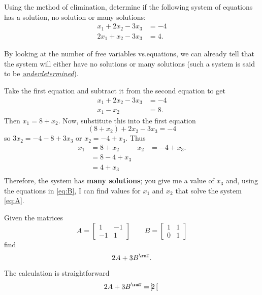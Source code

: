 \begin{questions}
  \question[10] Using the method of elimination, determine if the following
  system of equations has a solution, no solution or many solutions:
  \[
    \label{eq:A}
    \tag{$\bigstar$}
    \begin{aligned}
      x_1+2x_2-3x_3&=-4\\
      2x_1+x_2-3x_3&=4.
    \end{aligned}
  \]
  \begin{solution}
    By looking at the number of free variables vs.\@ equations, we can
    already tell that the system will either have no solutions or many
    solutions (such a system is said to be
    \emph{\href{https://en.wikipedia.org/wiki/Underdetermined_system}{underdetermined}}).

    Take the first equation and subtract it from the second equation to get
    \begin{align*}
      x_1+2x_2-3x_3&=-4\\
      x_1-x_2&=8.
    \end{align*}
    Then $x_1=8+x_2$. Now, substitute this into the first equation
    \[
      (8+x_2)+2x_2-3x_3=-4
    \]
    so $3x_2=-4-8+3x_3$ or $x_2=-4+x_3$. Thus
    \[
      \label{eq:B}
      \tag{$\spadesuit$}
      \begin{aligned}
        x_1&=8+x_2&
        x_2&=-4+x_3.\\
        &=8-4+x_3\\
        &=4+x_3\\
      \end{aligned}
    \]
    Therefore, the system has \textbf{many solutions}; you give me a value
    of $x_3$ and, using the equations in \eqref{eq:B}, I can find values
    for $x_1$ and $x_2$ that solve the system \eqref{eq:A}.
  \end{solution}
  \question[5] Given the matrices
  \[
    A=
    \begin{bmatrix}
      1&-1\\
      -1&1
    \end{bmatrix}
    \qquad
    B=
    \begin{bmatrix}
      1&1\\
      0&1
    \end{bmatrix}
  \]
  find
  \[
    2A+3B^\rmT.
  \]
  \begin{solution}
    The calculation is straightforward
    \begin{align*}
      2A+3B^\rmT
      &=
        2\begin{bmatrix}

\end{bmatrix}
\end{align*}
\end{solution}
\end{questions}
